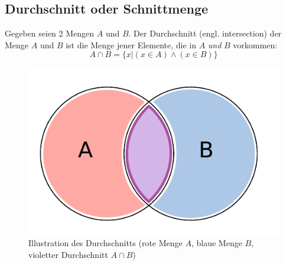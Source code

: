 \subsection{Durchschnitt oder Schnittmenge}
%
Gegeben seien 2 Mengen $A$ und $B$. Der Durchschnitt (engl. intersection)
der Menge $A$ und $B$ ist die Menge jener Elemente, die in $A$ \emph{und}
$B$ vorkommen:
\[
    A \cap B = \{x | (x \in A) \land (x \in B)\}
\]
%
\begin{figure}[p]
 \begin{center}
  \includegraphics{img/intersection.pdf}
  \caption{Illustration des Durchschnitts (rote Menge $A$, blaue Menge $B$,
        violetter Durchschnitt $A \cap B$)}
  \label{fig:union}
 \end{center}
\end{figure}

